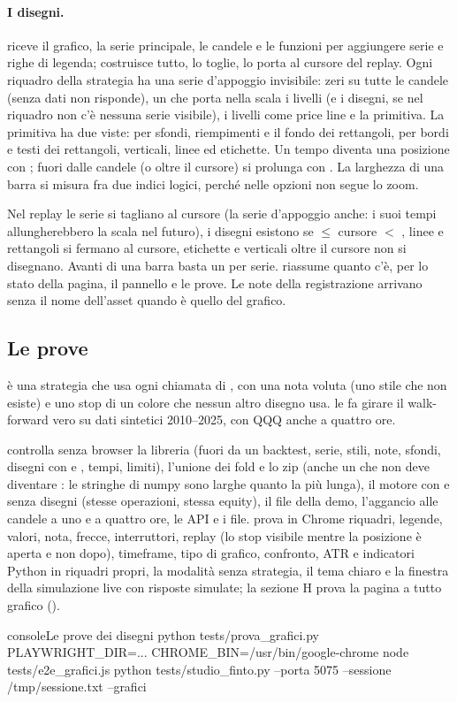 \paragraph{I disegni.}  riceve il grafico, la
serie principale, le candele e le funzioni per aggiungere serie e righe di
legenda;  costruisce tutto,  lo toglie,
 lo porta al cursore del replay. Ogni riquadro della
strategia ha una serie d'appoggio invisibile: zeri su tutte le candele (senza
dati  non risponde), un 
che porta nella scala i livelli (e i disegni, se nel riquadro non c'è nessuna
serie visibile), i livelli come price line e la primitiva. La primitiva ha due
viste:  per sfondi, riempimenti e il fondo dei rettangoli,
 per bordi e testi dei rettangoli, verticali, linee ed
etichette. Un tempo diventa una posizione con ; fuori dalle
candele (o oltre il cursore) si prolunga con . La larghezza
di una barra si misura fra due indici logici, perché  nelle
opzioni non segue lo zoom.

Nel replay le serie si tagliano al cursore (la serie d'appoggio anche: i suoi
tempi allungherebbero la scala nel futuro), i disegni esistono se
 $\le$ cursore $<$ , linee e rettangoli si fermano al
cursore, etichette e verticali oltre il cursore non si disegnano. Avanti di
una barra basta un  per serie.  riassume quanto c'è,
per lo stato della pagina, il pannello e le prove. Le note della
registrazione arrivano senza il nome dell'asset quando è quello del grafico.

\subsection{Le prove}

 è una strategia che usa ogni chiamata di
, con una nota voluta (uno stile che non esiste) e uno stop
di un colore che nessun altro disegno usa.  le
fa girare il walk-forward vero su dati sintetici 2010--2025, con QQQ anche a
quattro ore.

 controlla senza browser la libreria (fuori da un
backtest, serie, stili, note, sfondi, disegni con  e ,
tempi, limiti), l'unione dei fold e lo zip (anche un  che non deve
diventare : le stringhe di numpy sono larghe quanto la più lunga), il
motore con e senza disegni (stesse operazioni, stessa equity), il file della
demo, l'aggancio alle candele a uno e a quattro ore, le API e i file.
 prova in Chrome riquadri, legende, valori, nota,
frecce, interruttori, replay (lo stop visibile mentre la posizione è aperta e
non dopo), timeframe, tipo di grafico, confronto, ATR e indicatori Python in
riquadri propri, la modalità senza strategia, il tema chiaro e la finestra
della simulazione live con risposte simulate; la sezione H prova la pagina a
tutto grafico ().

\begin{codiceInterno}{console}{Le prove dei disegni}{}
python tests/prova_grafici.py
PLAYWRIGHT_DIR=... CHROME_BIN=/usr/bin/google-chrome node tests/e2e_grafici.js
python tests/studio_finto.py --porta 5075 --sessione /tmp/sessione.txt --grafici
\end{codiceInterno}
